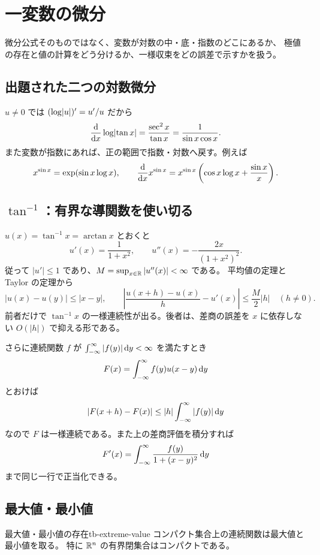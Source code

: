 \chapter{一変数の微分}
\label{ch:tb-differential}

微分公式そのものではなく、変数が対数の中・底・指数のどこにあるか、
極値の存在と値の計算をどう分けるか、一様収束をどの誤差で示すかを扱う。

\section{出題された二つの対数微分}

$u\ne0$ では $(\log\lvert u \rvert)'=u'/u$ だから
\[
\frac{\mathrm{d}}{\mathrm{d} x}\log\lvert \tan x \rvert
=\frac{\sec^2x}{\tan x}
=\frac1{\sin x\cos x}.
\]
また変数が指数にあれば、正の範囲で指数・対数へ戻す。例えば
\[
x^{\sin x}=\exp(\sin x\log x),
\qquad
\frac{\mathrm{d}}{\mathrm{d} x}x^{\sin x}
=x^{\sin x}\left(\cos x\log x+\frac{\sin x}{x}\right).
\]

\section{\texorpdfstring{$\tan^{-1}$}{tan inverse}：有界な導関数を使い切る}

$u(x)=\tan^{-1}x=\arctan x$ とおくと
\[
u'(x)=\frac1{1+x^2},\qquad
u''(x)=-\frac{2x}{(1+x^2)^2}.
\]
従って $|u'|\le1$ であり、$M=\sup_{x\in\mathbb{R}}|u''(x)|<\infty$ である。
平均値の定理と Taylor の定理から
\[
\boxed{|u(x)-u(y)|\le|x-y|},
\qquad
\boxed{
\left|\frac{u(x+h)-u(x)}h-u'(x)\right|
\le\frac M2|h|}\quad(h\ne0).
\]
前者だけで $\tan^{-1}x$ の一様連続性が出る。後者は、差商の誤差を
$x$ に依存しない $O(|h|)$ で抑える形である。

さらに連続関数 $f$ が $\int_{-\infty}^{\infty}|f(y)|\,\mathrm{d} y<\infty$ を満たすとき
\[
F(x)=\int_{-\infty}^{\infty}f(y)u(x-y)\,\mathrm{d} y
\]
とおけば
\[
|F(x+h)-F(x)|\le |h|\int_{-\infty}^{\infty}|f(y)|\,\mathrm{d} y
\]
なので $F$ は一様連続である。また上の差商評価を積分すれば
\[
F'(x)=\int_{-\infty}^{\infty}\frac{f(y)}{1+(x-y)^2}\,\mathrm{d} y
\]
まで同じ一行で正当化できる。

\section{最大値・最小値}

\begin{theorem}{最大値・最小値の存在}{tb-extreme-value}
コンパクト集合上の連続関数は最大値と最小値を取る。
特に $\mathbb{R}^n$ の有界閉集合はコンパクトである。
\end{theorem}

